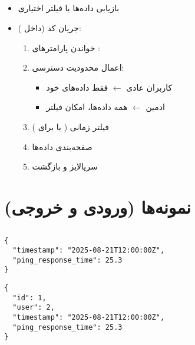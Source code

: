 \documentclass{report}
\begin{document}
\subsection{}
\begin{itemize}
    \item بازیابی داده‌ها با فیلتر اختیاری
    \item جریان کد (داخل ):
    \begin{enumerate}
        \item خواندن پارامترهای : 
        \item اعمال محدودیت دسترسی:
        \begin{itemize}
            \item کاربران عادی $\leftarrow$ فقط داده‌های خود
            \item ادمین $\leftarrow$ همه داده‌ها، امکان فیلتر 
        \end{itemize}
        \item فیلتر زمانی ( یا  برای )
        \item صفحه‌بندی داده‌ها
        \item سریالایز و بازگشت 
    \end{enumerate}
\end{itemize}

\section{نمونه‌ها (ورودی و خروجی)}
\subsection{}
\subsubsection{}
\begin{latin}
\begin{lstlisting}[style=jsonstyle]
{
  "timestamp": "2025-08-21T12:00:00Z",
  "ping_response_time": 25.3
}
\end{lstlisting}
\end{latin}
\textbf{}
\begin{latin}
\begin{lstlisting}[style=jsonstyle]
{
  "id": 1,
  "user": 2,
  "timestamp": "2025-08-21T12:00:00Z",
  "ping_response_time": 25.3
}
\end{lstlisting}
\end{latin}
\end{document}
